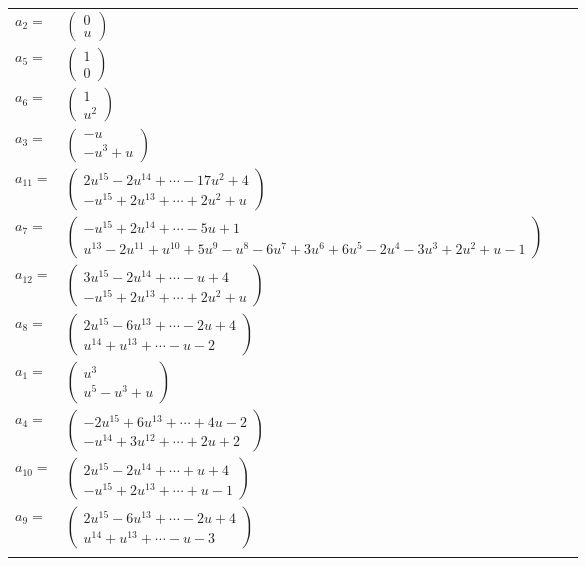 \documentclass[1p]{elsarticle_modified}
\theoremstyle{definition}
\begin{document}
\begin{tabular}{m{7pt} m{180pt} m{7pt} m{180pt} }
\flushright $a_{2}=$&$\begin{pmatrix}0\\u\end{pmatrix}$ \\
\flushright $a_{5}=$&$\begin{pmatrix}1\\0\end{pmatrix}$ \\
\flushright $a_{6}=$&$\begin{pmatrix}1\\u^2\end{pmatrix}$ \\
\flushright $a_{3}=$&$\begin{pmatrix}- u\\- u^3+u\end{pmatrix}$ \\
\flushright $a_{11}=$&$\begin{pmatrix}2 u^{15}-2 u^{14}+\cdots-17 u^2+4\\- u^{15}+2 u^{13}+\cdots+2 u^2+u\end{pmatrix}$ \\
\flushright $a_{7}=$&$\begin{pmatrix}- u^{15}+2 u^{14}+\cdots-5 u+1\\u^{13}-2 u^{11}+u^{10}+5 u^9- u^8-6 u^7+3 u^6+6 u^5-2 u^4-3 u^3+2 u^2+u-1\end{pmatrix}$ \\
\flushright $a_{12}=$&$\begin{pmatrix}3 u^{15}-2 u^{14}+\cdots- u+4\\- u^{15}+2 u^{13}+\cdots+2 u^2+u\end{pmatrix}$ \\
\flushright $a_{8}=$&$\begin{pmatrix}2 u^{15}-6 u^{13}+\cdots-2 u+4\\u^{14}+u^{13}+\cdots- u-2\end{pmatrix}$ \\
\flushright $a_{1}=$&$\begin{pmatrix}u^3\\u^5- u^3+u\end{pmatrix}$ \\
\flushright $a_{4}=$&$\begin{pmatrix}-2 u^{15}+6 u^{13}+\cdots+4 u-2\\- u^{14}+3 u^{12}+\cdots+2 u+2\end{pmatrix}$ \\
\flushright $a_{10}=$&$\begin{pmatrix}2 u^{15}-2 u^{14}+\cdots+u+4\\- u^{15}+2 u^{13}+\cdots+u-1\end{pmatrix}$ \\
\flushright $a_{9}=$&$\begin{pmatrix}2 u^{15}-6 u^{13}+\cdots-2 u+4\\u^{14}+u^{13}+\cdots- u-3\end{pmatrix}$\\&\end{tabular}
\end{document}
